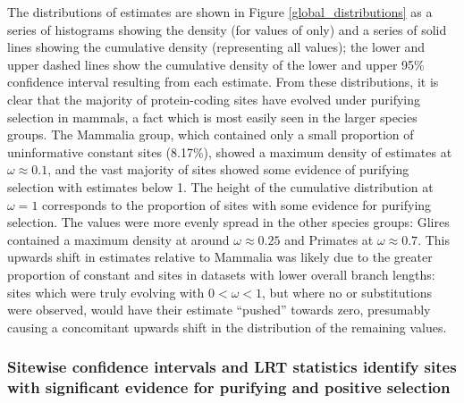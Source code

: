 The distributions of \omgml estimates are shown in Figure
\ref{global_distributions} as a series of histograms showing the
\omgml density (for \nz values of \omgml only) and a series of solid
lines showing the cumulative \omgml density (representing all values);
the lower and upper dashed lines show the cumulative density of the
lower and upper 95\% confidence interval resulting from each \sw
estimate. From these distributions, it is clear that the majority of
protein-coding sites have evolved under purifying selection in
mammals, a fact which is most easily seen in the larger species
groups. The Mammalia group, which contained only a small proportion of
uninformative constant sites (8.17\%), showed a maximum density of \nz
\omgml estimates at $\omega\approx0.1$, and the vast majority of sites
showed some evidence of purifying selection with \omgml estimates
below 1. The height of the \omgml cumulative distribution at
$\omega=1$ corresponds to the proportion of sites with some evidence
for purifying selection. The \nz \omgml values were more evenly spread
in the other species groups: Glires contained a maximum \nz \omgml
density at around $\omega\approx0.25$ and Primates at
$\omega\approx0.7$. This upwards shift in \nz \omgml estimates
relative to Mammalia was likely due to the greater proportion of
constant and \syn sites in datasets with lower overall branch lengths:
sites which were truly evolving with $0<\omega<1$, but where no \nsyn
or \syn substitutions were observed, would have their \omgml estimate
``pushed'' towards zero, presumably causing a concomitant upwards
shift in the distribution of the remaining \nz \omgml values.

\subsubsection{Sitewise confidence intervals and LRT statistics identify sites with significant evidence for purifying and positive selection}

